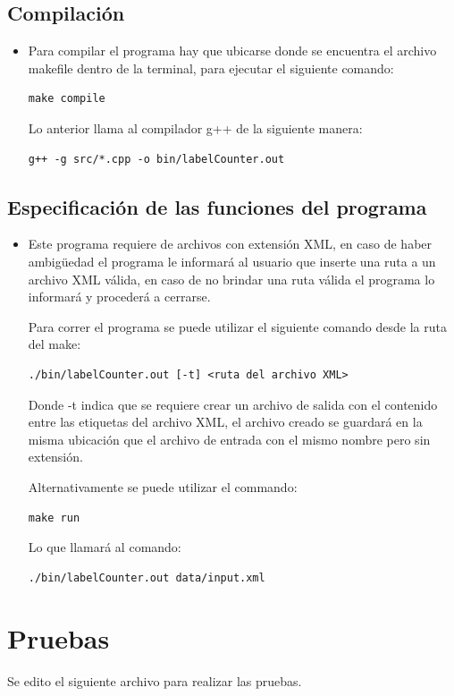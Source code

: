 \subsection{Compilación}
\begin{itemize}
    \item[]Para compilar el programa hay que ubicarse donde se encuentra el archivo makefile dentro de la terminal, para ejecutar el siguiente comando:
\begin{lstlisting}[style= Cstyle]
	make compile
\end{lstlisting}
  	Lo anterior llama al compilador g++ de la siguiente manera: 
\begin{lstlisting}[style= Cstyle]
	g++ -g src/*.cpp -o bin/labelCounter.out
\end{lstlisting}
    \end{itemize}
\subsection{Especificación de las funciones del programa}
\begin{itemize}   
	\item[] Este programa requiere de archivos con extensión XML, en caso de haber ambigüedad el programa le informará al usuario que inserte una ruta a un archivo XML válida, en caso de no brindar una ruta válida el programa lo informará y procederá a cerrarse.
    
	Para correr el programa se puede utilizar el siguiente comando desde la ruta del make:
\begin{lstlisting}[style= Cstyle]
	./bin/labelCounter.out [-t] <ruta del archivo XML>
\end{lstlisting} 
	Donde -t indica que se requiere crear un archivo de salida con el contenido entre las etiquetas del archivo XML, el archivo creado se guardará en la misma ubicación que el archivo de entrada con el mismo nombre pero sin extensión.
	

	Alternativamente se puede utilizar el commando:
\begin{lstlisting}[style= Cstyle]
	make run
\end{lstlisting}
    Lo que llamará al comando:
\begin{lstlisting}[style= Cstyle]
	./bin/labelCounter.out data/input.xml
\end{lstlisting}
\end{itemize}
\section{Pruebas}
    Se edito el siguiente archivo para realizar las pruebas.
    
